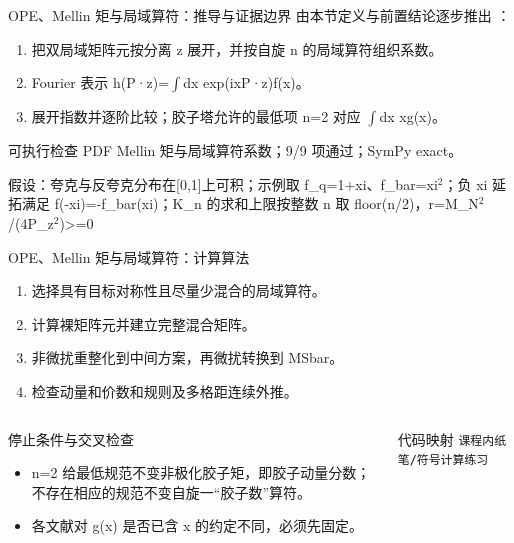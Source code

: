 \begin{frame}[t]{OPE、Mellin 矩与局域算符：推导与证据边界}
\footnotesize
{}\quad 由本节定义与前置结论逐步推出 ：
\begin{enumerate}
\item 把双局域矩阵元按分离 z 展开，并按自旋 n 的局域算符组织系数。
\item Fourier 表示 h(P·z)=\ensuremath{\int}dx exp(ixP·z)f(x)。
\item 展开指数并逐阶比较；胶子塔允许的最低项 n=2 对应 \ensuremath{\int}dx xg(x)。
\end{enumerate}\begin{block}{可执行检查}
\quad PDF Mellin 矩与局域算符系数；9/9 项通过；SymPy exact。
\par\scriptsize 假设：夸克与反夸克分布在[0,1]上可积；示例取 f\_q=1+xi、f\_bar=xi\ensuremath{^{2}}；负 xi 延拓满足 f(-xi)=-f\_bar(xi)；K\_n 的求和上限按整数 n 取 floor(n/\allowbreak{}2)，r=M\_N\ensuremath{^{2}}/\allowbreak{}(4P\_z\ensuremath{^{2}})>=0
\end{block}
\end{frame}

\begin{frame}[t]{OPE、Mellin 矩与局域算符：计算算法}
\footnotesize
{}\begin{enumerate}
\item 选择具有目标对称性且尽量少混合的局域算符。
\item 计算裸矩阵元并建立完整混合矩阵。
\item 非微扰重整化到中间方案，再微扰转换到 MSbar。
\item 检查动量和价数和规则及多格距连续外推。
\end{enumerate}\begin{columns}[T,onlytextwidth]
\begin{block}{停止条件与交叉检查}\scriptsize\begin{itemize}
\item[\CheckMark] n=2 给最低规范不变非极化胶子矩，即胶子动量分数；不存在相应的规范不变自旋一“胶子数”算符。
\item[\CheckMark] 各文献对 g(x) 是否已含 x 的约定不同，必须先固定。
\end{itemize}\end{block}
\begin{block}{代码映射}
\scriptsize \texttt{课程内纸笔/\allowbreak{}符号计算练习}
\end{block}\end{columns}\end{frame}

